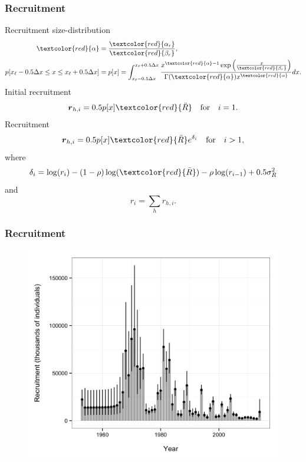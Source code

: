 \documentclass{beamer}
\begin{document}
\begin{frame}
\frametitle{Recruitment}
Recruitment size-distribution
\begin{align*}
  \textcolor{red}{\alpha} &= \frac{\textcolor{red}{\alpha_r}}{\textcolor{red}{\beta_r}},\\
  p[x_\ell-0.5 \Delta x \le x \le x_\ell+0.5 \Delta x] &= p[x] = \int^{x_\ell+0.5
    \Delta x}_{x_\ell-0.5 \Delta x} \frac{ x^{\textcolor{red}{\alpha} - 1} \exp
    \left( \frac{x}{\textcolor{red}{\beta_r}} \right)}
    {\Gamma (\textcolor{red}{\alpha}) x^{\textcolor{red}{\alpha}}} dx.
\end{align*}
Initial recruitment
\begin{equation*}
  \boldsymbol{r}_{h,i} = 0.5 p[x] \textcolor{red}{\ddot{R}} \quad \text{for} \quad i=1.
\end{equation*}
Recruitment
\begin{equation*}
  \boldsymbol{r}_{h,i} = 0.5 p[x] \textcolor{red}{\bar{R}} e^{\delta_i}  \quad \text{for} \quad i>1,
\end{equation*}
where
\begin{equation*}
  \delta_i = \log (r_i) - (1-\rho) \log (\textcolor{red}{\bar{R}}) - \rho \log(r_{i-1}) + 0.5 \sigma^2_R
\end{equation*}
and
\begin{equation*}
  r_i = \sum_h r_{h,i}.
\end{equation*}
\end{frame}


\begin{frame}
\frametitle{Recruitment}
\begin{figure}[!htbp]
  \centering
  \includegraphics[width=0.75\linewidth]{../../examples/bbrkc/OneSex/figure/recruitment.png}
\end{figure}
\end{frame}
\end{document}
